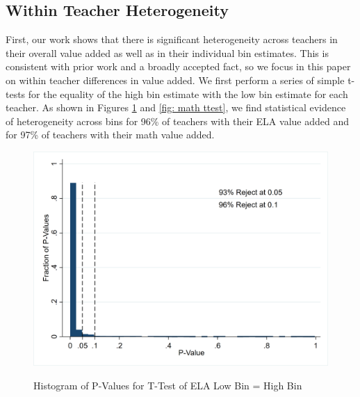 \documentclass[letterpaper,12pt]{article}
\begin{document}
\subsection{Within Teacher Heterogeneity}

First, our work shows that there is significant heterogeneity across teachers in their overall value added as well as in their individual bin estimates. This is consistent with prior work and a broadly accepted fact, so we focus in this paper on within teacher differences in value added. We first perform a series of simple t-tests for the equality of the high bin estimate with the low bin estimate for each teacher. As shown in Figures \ref{fig: ELA ttest} and \ref{fig: math ttest}, we find statistical evidence of heterogeneity across bins for 96\% of teachers with their ELA value added and for 97\% of teachers with their math value added. 

\begin{figure}[ht]
    \centering
    \caption{Histogram of P-Values for T-Test of ELA Low Bin = High Bin}
    \includegraphics[width=\textwidth]{figures/ELA_T_Test_Hist.png}
    \label{fig: ELA ttest}
\end{figure}
\end{document}
